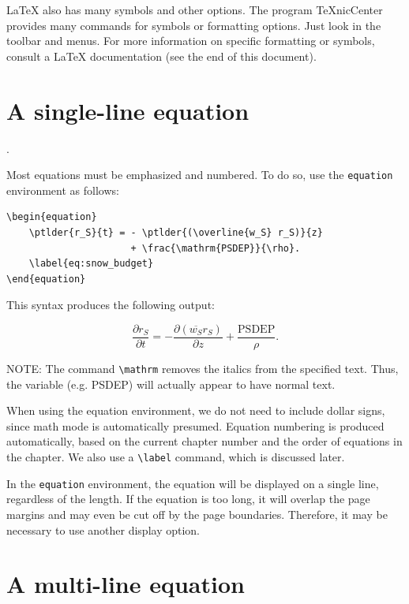\documentclass[master]{UWMThesis}
\newcommand{\ptlder}[2]{\frac{\partial #1}{\partial #2}}
\begin{document}
LaTeX also has many symbols and other options.  The program TeXnicCenter provides many commands for symbols or formatting options.  Just look in the toolbar and menus.  For more information on specific formatting or symbols, consult a LaTeX documentation (see the end of this document).

\section{A single-line equation}  \label{sec:single_line_eq}.

Most equations must be emphasized and numbered.  To do so, use the \verb=equation= environment as follows:

\pagebreak

\begin{verbatim}
\begin{equation}
    \ptlder{r_S}{t} = - \ptlder{(\overline{w_S} r_S)}{z}
                      + \frac{\mathrm{PSDEP}}{\rho}.
    \label{eq:snow_budget}
\end{equation}
\end{verbatim}

This syntax produces the following output:

\begin{equation}
    \ptlder{r_S}{t} = - \ptlder{(\overline{w_S} r_S)}{z}  + \frac{\mathrm{PSDEP}}{\rho}.
    \label{eq:snow_budget}
\end{equation}

NOTE: The command \verb=\mathrm= removes the italics from the specified text.  Thus, the variable (e.g. PSDEP) will actually appear to have normal text.

When using the equation environment, we do not need to include dollar signs, since math mode is automatically presumed.  Equation numbering is produced automatically, based on the current chapter number and the order of equations in the chapter.  We also use a \verb=\label= command, which is discussed later.

In the \verb=equation= environment, the equation will be displayed on a single line, regardless of the length.  If the equation is too long, it will overlap the page margins and may even be cut off by the page boundaries.  Therefore, it may be necessary to use another display option.


\section{A multi-line equation} \label{sec:multi_line_eq}
\end{document}

